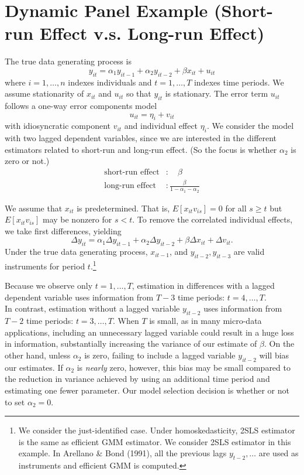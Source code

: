 \section{Dynamic Panel Example (Short-run Effect v.s. Long-run Effect)}
\label{sec:SRvsLR}

\vspace{0.1in}
The true data generating process is 
	\begin{equation}
				y_{it} = \alpha_1 y_{it-1} + \alpha_2 y_{it-2} + \beta x_{it} + u_{it}
	\end{equation}
where $i = 1, \hdots, n$ indexes individuals and $t=1, \hdots, T$  indexes time periods. We assume stationarity of $x_{it}$ and $u_{it}$ so that $y_{it}$ is stationary. The error term $u_{it}$ follows a one-way error components model
	\begin{equation}
				u_{it}= \eta_i + v_{it}
	\end{equation}
with idiosyncratic component $v_{it}$ and individual effect $\eta_i$. We consider the model with two lagged dependent variables, since we are interested in the different estimators related to short-run and long-run effect. (So the focus is whether $\alpha_2$ is zero or not.) 
\begin{align*}
\text{short-run effect} &: \quad \beta\\
\text{long-run effect} &: \frac{\beta}{1-\alpha_1-\alpha_2}
\end{align*}

We assume that $x_{it}$ is predetermined. 
That is, $E[x_{it}v_{is}] = 0$ for all $s\geq t$ but $E[x_{it}v_{is}]$ may be nonzero for $s<t$. 
To remove the correlated individual effects, we take first differences, yielding
	\begin{equation}
	\Delta y_{it} = \alpha_1 \Delta y_{it-1} + \alpha_2 \Delta y_{it-2} + \beta \Delta x_{it} + \Delta v_{it}.
	\end{equation}
Under the true data generating process, $x_{it-1}$, and $ y_{it-2}, y_{it-3}$ are valid instruments for period $t$.\footnote{We consider the just-identified case. Under homoskedasticity, 2SLS estimator is the same as efficient GMM estimator. We consider 2SLS estimator in this example. In Arellano \& Bond (1991), all the previous lags $y_{t-2}, \hdots$ are used as instruments and efficient GMM is computed.}

Because we observe only $t = 1, \hdots, T$, estimation in differences with a lagged dependent variable uses information from $T-3$ time periods: $t = 4, \hdots, T$.\\
In contrast, estimation without a lagged variable $y_{it-2}$ uses information from $T-2$ time periods: $t=3, \hdots, T$.
When $T$ is small, as in many micro-data applications, including an unnecessary lagged variable could result in a huge loss in information, substantially increasing the variance of our estimate of $\beta$. 
On the other hand, unless $\alpha_2$ is zero, failing to include a lagged variable $y_{it-2}$ will bias our estimates. 
If $\alpha_2$ is \emph{nearly} zero, however, this bias may be small compared to the reduction in variance achieved by using an additional time period and estimating one fewer parameter. 
Our model selection decision is whether or not to set $\alpha_2 = 0$.  

